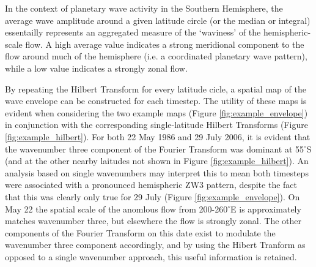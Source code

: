 In the context of planetary wave activity in the Southern Hemisphere, the average wave amplitude around a given latitude circle (or the median or integral) essentailly represents an aggregated measure of the `waviness' of the hemispheric-scale flow. A high average value indicates a strong meridional component to the flow around much of the hemisphere (i.e. a coordinated planetary wave pattern), while a low value indicates a strongly zonal flow. 

By repeating the Hilbert Transform for every latitude cicle, a spatial map of the wave envelope can be constructed for each timestep. The utility of these maps is evident when considering the two example maps (Figure \ref{fig:example_envelope}) in conjunction with the corresponding single-latitude Hilbert Transforms (Figure \ref{fig:example_hilbert}). For both 22 May 1986 and 29 July 2006, it is evident that the wavenumber three component of the Fourier Transform was dominant at 55$^{\circ}$S (and at the other nearby laitudes not shown in Figure \ref{fig:example_hilbert}). An analysis based on single wavenumbers may interpret this to mean both timesteps were associated with a pronounced hemispheric ZW3 pattern, despite the fact that this was clearly only true for 29 July (Figure \ref{fig:example_envelope}). On May 22 the spatial scale of the anomlous flow from 200-260$^{\circ}$E is approximately matches wavenumber three, but elsewhere the flow is strongly zonal. The other components of the Fourier Transform on this date exist to modulate the wavenumber three component accordingly, and by using the Hibert Tranform as opposed to a single wavenumber approach, this useful information is retained.
